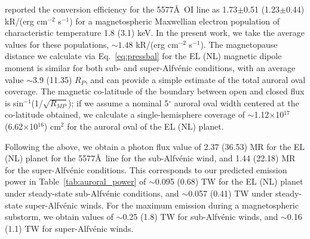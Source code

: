 \documentclass{emulateapj}
\begin{document}

\citet{Steele1990} reported the conversion efficiency for the 5577\AA\ OI line as 1.73$\pm$0.51 (1.23$\pm$0.44) kR/(erg cm$^{-2}$ s$^{-1}$) for a magnetospheric Maxwellian electron population of characteristic temperature 1.8 (3.1) keV. In the present work, we take the average values for these populations, ${\sim} 1.48$ kR/(erg cm$^{-2}$ s$^{-1}$). The magnetopause distance we calculate via Eq.~\ref{eq:pressbal} for the EL (NL) magnetic dipole moment is similar for both sub- and super-Alfv\'{e}nic conditions, with an average value $\sim$3.9 (11.35) $R_P$, and can provide a simple estimate of the total auroral oval coverage. The magnetic co-latitude of the boundary between open and closed flux is sin$^{-1}$(1/$\sqrt{R_{MP}}$); if we assume a nominal 5$^\circ$ auroral oval width centered at the co-latitude obtained, we calculate a single-hemisphere coverage of $\sim$1.12$\times$10$^{17}$ (6.62$\times$10$^{16}$) cm$^2$ for the auroral oval of 
the EL (NL) planet.


Following the above, we obtain a photon flux value of 2.37 (36.53) MR for the EL (NL) planet for the 5577\AA\ line for the sub-Alfv\'{e}nic wind, and 1.44 (22.18) MR for the super-Alfv\'{e}nic conditions. This corresponds to our predicted emission power in Table~\ref{tab:auroral_power} of $\sim$0.095 (0.68) TW for the EL (NL) planet under steady-state sub-Alfv\'{e}nic conditions, and $\sim$0.057 (0.41) TW under steady-state super-Alfv\'{e}nic winds. For the maximum emission during a magnetospheric substorm, we obtain values of $\sim$0.25 (1.8) TW for sub-Alfv\'{e}nic winds, and $\sim$0.16 (1.1) TW for super-Alfv\'{e}nic winds. 
 
\end{document}
